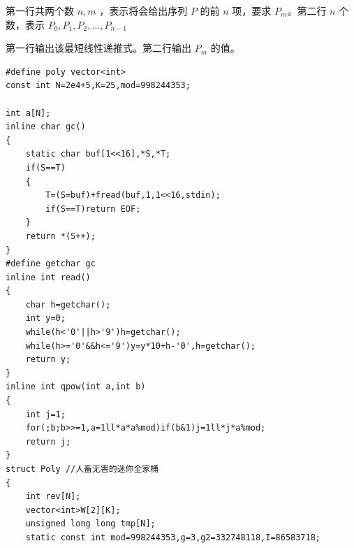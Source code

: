 \par \noindent 第一行共两个数 $n,m$ ，表示将会给出序列 $P$ 的前 $n$ 项，要求 $P_m$。第二行 $n$ 个数，表示 $P_0,P_1,P_2,\ldots,P_{n-1}$
~\\
\par \noindent 第一行输出该最短线性递推式。第二行输出 $P_m$ 的值。
\begin{verbatim}
#define poly vector<int>
const int N=2e4+5,K=25,mod=998244353;

int a[N];
inline char gc()
{
    static char buf[1<<16],*S,*T;
    if(S==T)
    {
        T=(S=buf)+fread(buf,1,1<<16,stdin);
        if(S==T)return EOF;
    }
    return *(S++);
}
#define getchar gc
inline int read()
{
    char h=getchar();
    int y=0;
    while(h<'0'||h>'9')h=getchar();
    while(h>='0'&&h<='9')y=y*10+h-'0',h=getchar();
    return y;
}
inline int qpow(int a,int b)
{
    int j=1;
    for(;b;b>>=1,a=1ll*a*a%mod)if(b&1)j=1ll*j*a%mod;
    return j;
}
struct Poly //人畜无害的迷你全家桶
{
    int rev[N];
    vector<int>W[2][K];
    unsigned long long tmp[N];
    static const int mod=998244353,g=3,g2=332748118,I=86583718;
    

\end{verbatim}

